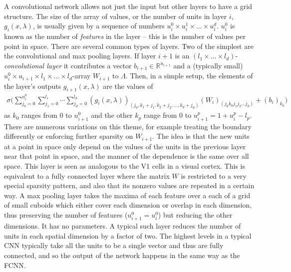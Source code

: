 A convolutional network allows not just the input but other layers to have a grid structure.
The size of the array of values, or the number of units in layer $i$, $g_i(x,\lambda)$, is usually given by a sequence of numbers $u_i^0\times u_i^1\times\dots\times u_i^d$.
$u_i^0$ is known as the number of \emph{features} in the layer -- this is the number of values per point in space.
There are several common types of layers.
Two of the simplest are the convolutional and max pooling layers.
If layer $i+1$ is an $(l_1\times\dots\times l_d)$-\emph{convolutional layer} it contributes a vector $b_{i+1}\in\mathbb{R}^{u_{i+1}}$ and a (typically small) $u_{i}^{0}\times u_{i+1}\times l_1\times\dots\times l_d$-array $W_{i+1}$ to $\Lambda$.
Then, in a simple setup, the elements of the layer's outputs $g_{i+1}(x,\lambda)$ are the values of 
\begin{align}
  \sigma\Big(\sum_{j_0=0}^{u_{i}^0}\sum_{j_1=0}^{l_1}\cdots\sum_{j_d=0}^{l_d
 }(g_i(x,\lambda))_{(j_0,k_1+j_1,k_2+j_2,\dots,k_d+j_d)}(W_i)_{(j_0k_0j_1j_2\dots j_d)}+(b_i)_{k_0}\Big)
\end{align}
as $k_0$ ranges from 0 to $u_{i+1}^0$ and the other $k_p$ range from 0 to $u_{i+1}^p=1+u_i^{p}-l_p$.
There are numerous variations on this theme, for example treating the boundary differently or enforcing further sparsity on $W_{i+1}$.
The idea is that the new units at a point in space only depend on the values of the units in the previous layer near that point in space, and the manner of the dependence is the same over all space.
This layer is seen as analogous to the V1 cells in a visual cortex.
This is equivalent to a fully connected layer where the matrix $W$ is restricted to a very special sparsity pattern, and also that its nonzero values are repeated in a certain way.
A max pooling layer takes the maxima of each feature over a each of a grid of small cuboids which either cover each dimension or overlap in each dimension, thus preserving the number of features ($u_{i+1}^0=u_i^0$) but reducing the other dimensions.
It has no parameters. A typical such layer reduces the number of units in each spatial dimension by a factor of two.
The highest levels in a typical CNN typically take all the units to be a single vector and thus are fully connected, and so the output of the network happens in the same way as the FCNN\@.

